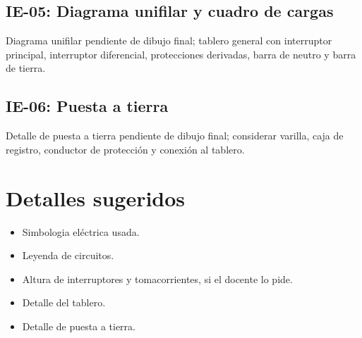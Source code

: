\subsection{IE-05: Diagrama unifilar y cuadro de cargas}

Diagrama unifilar pendiente de dibujo final; tablero general con interruptor principal, interruptor diferencial, protecciones derivadas, barra de neutro y barra de tierra.

\subsection{IE-06: Puesta a tierra}

Detalle de puesta a tierra pendiente de dibujo final; considerar varilla, caja de registro, conductor de protección y conexión al tablero.

\section{Detalles sugeridos}

\begin{itemize}
  \item Simbologia eléctrica usada.
  \item Leyenda de circuitos.
  \item Altura de interruptores y tomacorrientes, si el docente lo pide.
  \item Detalle del tablero.
  \item Detalle de puesta a tierra.
\end{itemize}
